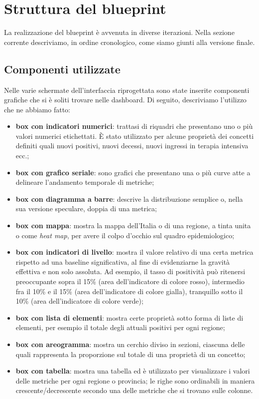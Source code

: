 \section{Struttura del blueprint}\label{s:struttura-blueprint}
La realizzazione del blueprint è avvenuta in diverse iterazioni. Nella sezione corrente descriviamo, in ordine cronologico, come siamo giunti alla versione finale.

\subsection{Componenti utilizzate}\label{ss:componenti-utilizzate}
Nelle varie schermate dell'interfaccia riprogettata sono state inserite componenti grafiche che si è soliti trovare nelle dashboard. Di seguito, descriviamo l'utilizzo che ne abbiamo fatto:
\begin{itemize}
    \item \textbf{box con indicatori numerici}: trattasi di riquadri che presentano uno o più valori numerici etichettati. È stato utilizzato per alcune proprietà dei concetti definiti quali nuovi positivi, nuovi decessi, nuovi ingressi in terapia intensiva ecc.;
    \item \textbf{box con grafico seriale}: sono grafici che presentano una o più curve atte a delineare l'andamento temporale di metriche;
    \item \textbf{box con diagramma a barre}: descrive la distribuzione semplice o, nella sua versione speculare, doppia di una metrica;
    \item \textbf{box con mappa}: mostra la mappa dell'Italia o di una regione, a tinta unita o come \textit{heat map}, per avere il colpo d'occhio sul quadro epidemiologico;
    \item \textbf{box con indicatori di livello}: mostra il valore relativo di una certa metrica rispetto ad una baseline significativa, al fine di evidenziarne la gravità effettiva e non solo assoluta. Ad esempio, il tasso di positività può ritenersi preoccupante sopra il 15\% (area dell'indicatore di colore rosso), intermedio fra il 10\% e il 15\% (area dell'indicatore di colore gialla), tranquillo sotto il 10\% (area dell'indicatore di colore verde);
    \item \textbf{box con lista di elementi}: mostra certe proprietà sotto forma di liste di elementi, per esempio il totale degli attuali positivi per ogni regione;
    \item \textbf{box con areogramma}: mostra un cerchio diviso in sezioni, ciascuna delle quali rappresenta la proporzione sul totale di una proprietà di un concetto;
    \item \textbf{box con tabella}: mostra una tabella ed è utilizzato per visualizzare i valori delle metriche per ogni regione o provincia; le righe sono ordinabili in maniera crescente/decrescente secondo una delle metriche che si trovano sulle colonne.
\end{itemize}


